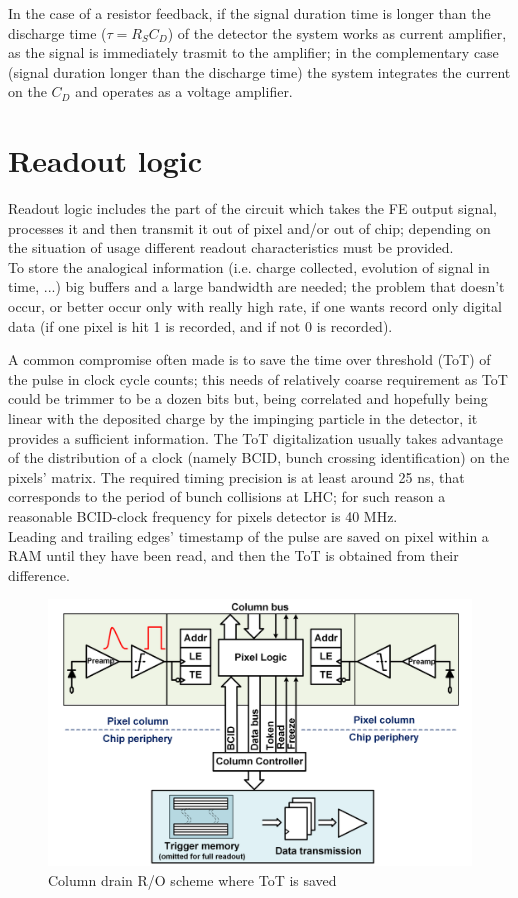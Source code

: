       In the case of a resistor feedback, if the signal duration time is longer than the discharge time ($\tau=R_S C_D$) of the detector the system works as current amplifier, as the signal is immediately trasmit to the amplifier; in the complementary case (signal duration longer than the discharge time) the system integrates the current on the $C_D$ and operates as a voltage amplifier.
      
\section{Readout logic}
   Readout logic includes the part of the circuit which takes the FE output signal, processes it and then transmit it out of pixel and/or out of chip; depending on the situation of usage different readout characteristics must be provided. \\
   To store the analogical information (i.e. charge collected, evolution of signal in time, ...) big buffers and a large bandwidth are needed; the problem that doesn't occur, or better occur only with really high rate, if one wants record only digital data (if one pixel is hit 1 is recorded, and if not 0 is recorded). 

   A common compromise often made is to save the time over threshold (ToT) of the pulse in clock cycle counts; this needs of relatively coarse requirement as ToT could be trimmer to be a dozen bits but, being correlated and hopefully being linear with the deposited charge by the impinging particle in the detector, it provides a sufficient information.
   The ToT digitalization usually takes advantage of the distribution of a clock (namely BCID,  bunch crossing identification) on the pixels' matrix. The required timing precision is at least around 25 ns, that corresponds to the period of bunch collisions at LHC; for such reason a reasonable BCID-clock frequency for pixels detector is 40 MHz.\\
   Leading and trailing edges' timestamp of the pulse are saved on pixel within a RAM until they have been read,  and then the ToT is obtained from their difference.
   \begin{figure}[h!]
      \centering
      \includegraphics[width=.7\linewidth]{figures/Pixel_detectors/column_drain_RO.png}
      \caption{Column drain R/O scheme where ToT is saved}
      \label{fig:column_drain_RO-like}
   \end{figure}

